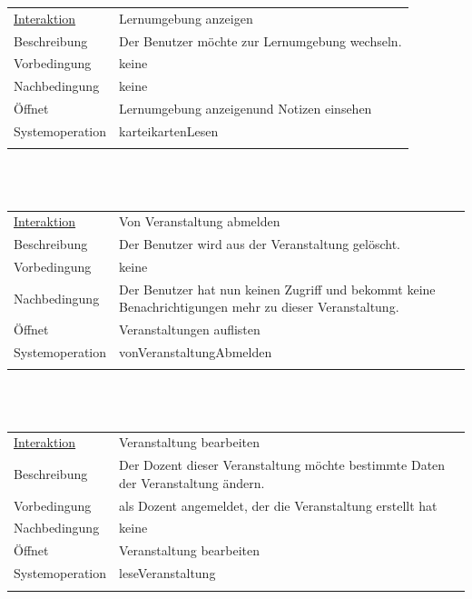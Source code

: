\documentclass[12pt,a4paper]{article}
\begin{document}
{\begin{tabular}{l p{12cm}}
\underline{Interaktion}  	 & Lernumgebung anzeigen\\ 
Beschreibung   	 & Der Benutzer möchte zur Lernumgebung wechseln.  \\
Vorbedingung	 & keine \\
Nachbedingung	 & keine \\
Öffnet			 & \glqq Lernumgebung anzeigen\grqq und \glqq Notizen einsehen\grqq \\
Systemoperation & karteikartenLesen\\\\
\end{tabular}\\\\

\begin{tabular}{l p{12cm}}
\underline{Interaktion}  	 & Von Veranstaltung abmelden\\ 
Beschreibung   	 & Der Benutzer wird aus der Veranstaltung gelöscht.  \\
Vorbedingung	 & keine \\
Nachbedingung	 & Der Benutzer hat nun keinen Zugriff und bekommt keine Benachrichtigungen mehr zu dieser Veranstaltung. \\
Öffnet			 & \glqq Veranstaltungen auflisten\grqq \\
Systemoperation & vonVeranstaltungAbmelden\\\\
\end{tabular}\\\\

\begin{tabular}{l p{12cm}}
\underline{Interaktion}  	 & Veranstaltung bearbeiten\\ 
Beschreibung   	 & Der Dozent dieser Veranstaltung möchte bestimmte Daten der Veranstaltung ändern.  \\
Vorbedingung	 & als Dozent angemeldet, der die Veranstaltung erstellt hat \\
Nachbedingung	 & keine \\
Öffnet			 & \glqq Veranstaltung bearbeiten\grqq \\
Systemoperation & leseVeranstaltung\\\\
\end{tabular}\\\\

}
\end{document}
